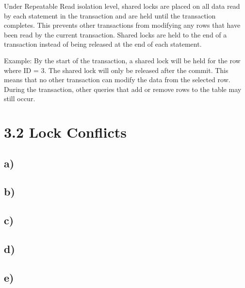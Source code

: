 \documentclass[ngerman]{dis-template-add}
\begin{document}
Under Repeatable Read isolation level, shared locks are placed on all data read by each statement in the transaction and are held until the transaction completes.
This prevents other transactions from modifying any rows that have been read by the current transaction.
Shared locks are held to the end of a transaction instead of being released at the end of each statement.

Example:
By the start of the transaction, a shared lock will be held for the row where ID = 3. The shared lock will only be released after the commit. This means that no other transaction can modify the data from the selected row.
During the transaction, other queries that add or remove rows to the table may still occur.






\section*{3.2 Lock Conflicts}

\subsection*{a)}

\subsection*{b)}

\subsection*{c)}

\subsection*{d)}

\subsection*{e)}
\end{document}
